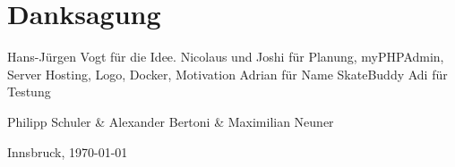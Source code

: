\section*{Danksagung}

Hans-Jürgen Vogt für die Idee.
Nicolaus und Joshi für Planung, myPHPAdmin, Server Hosting, Logo, Docker, Motivation
Adrian für Name SkateBuddy
Adi für Testung
\vspace{1cm}

Philipp Schuler \& Alexander Bertoni \& Maximilian Neuner

Innsbruck, \today

\newpage